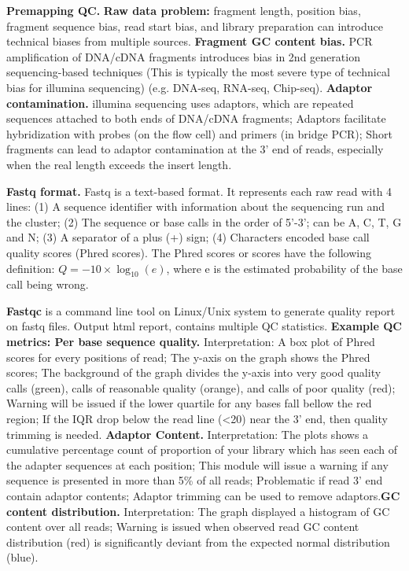 \vspace{0.1em}\noindent
\textbf{Premapping QC.} \textbf{Raw data problem:} fragment length, position bias, fragment sequence bias, read start bias, and library preparation can introduce technical biases from multiple sources. \textbf{Fragment GC content bias.} PCR amplification of DNA/cDNA fragments introduces bias in 2nd generation sequencing-based techniques (This is typically the most severe type of technical bias for illumina sequencing) (e.g. DNA-seq, RNA-seq, Chip-seq). \textbf{Adaptor contamination.} illumina sequencing uses adaptors, which are repeated sequences attached to both ends of DNA/cDNA fragments; Adaptors facilitate hybridization with probes (on the flow cell) and primers (in bridge PCR); Short fragments can lead to adaptor contamination at the 3' end of reads, especially when the real length exceeds the insert length.

\vspace{0.1em}\noindent
\textbf{Fastq format.} Fastq is a text-based format. It represents each raw read with 4 lines: (1) A sequence identifier with information about the sequencing run and the cluster; (2) The sequence or base calls in the order of 5'-3'; can be A, C, T, G and N; (3) A separator of a plus (+) sign; (4) Characters encoded base call quality scores (Phred scores). The Phred scores or scores have the following definition: $Q=-10\times\log_{10}(e)$, where e is the estimated probability of the base call being wrong.

\vspace{0.1em}\noindent
\textbf{Fastqc} is a command line tool on Linux/Unix system to generate quality report on fastq files. Output html report, contains multiple QC statistics. \textbf{Example QC metrics: Per base sequence quality.} Interpretation: A box plot of Phred scores for every positions of read; The y-axis on the graph shows the Phred scores; The background of the graph divides the y-axis into very good quality calls (green), calls of reasonable quality (orange), and calls of poor quality (red); Warning will be issued if the lower quartile for any bases fall bellow the red region; If the IQR drop below the read line (<20) near the 3' end, then quality trimming is needed. \textbf{Adaptor Content.} Interpretation: The plots shows a cumulative percentage count of proportion of your library which has seen each of the adapter sequences at each position; This module will issue a warning if any sequence is presented in more than 5\% of all reads; Problematic if read 3' end contain adaptor contents; Adaptor trimming can be used to remove adaptors.\textbf{GC content distribution.} Interpretation: The graph displayed a histogram of GC content over all reads; Warning is issued when observed read GC content distribution (red) is significantly deviant from the expected normal distribution (blue).

